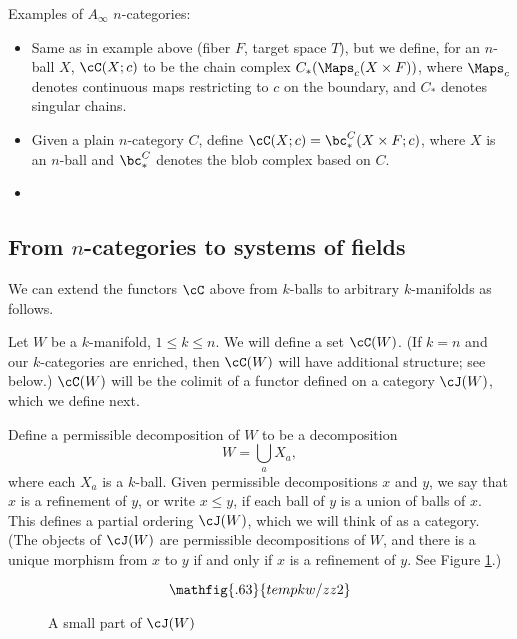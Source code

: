 Examples of $A_\infty$ $n$-categories:
\begin{itemize}

\item Same as in example  above (fiber $F$, target space $T$),
but we define, for an $n$-ball $X$, $\cC(X; c)$ to be the chain complex 
$C_*(\Maps_c(X\times F))$, where $\Maps_c$ denotes continuous maps restricting to $c$ on the boundary,
and $C_*$ denotes singular chains.

\item
Given a plain $n$-category $C$, 
define $\cC(X; c) = \bc^C_*(X\times F; c)$, where $X$ is an $n$-ball
and $\bc^C_*$ denotes the blob complex based on $C$.

\item {}

\end{itemize}






\subsection{From $n$-categories to systems of fields}
\label{ss:ncat_fields}

We can extend the functors $\cC$ above from $k$-balls to arbitrary $k$-manifolds as follows.

Let $W$ be a $k$-manifold, $1\le k \le n$.
We will define a set $\cC(W)$.
(If $k = n$ and our $k$-categories are enriched, then
$\cC(W)$ will have additional structure; see below.)
$\cC(W)$ will be the colimit of a functor defined on a category $\cJ(W)$,
which we define next.

Define a permissible decomposition of $W$ to be a decomposition
\[
	W = \bigcup_a X_a ,
\]
where each $X_a$ is a $k$-ball.
Given permissible decompositions $x$ and $y$, we say that $x$ is a refinement
of $y$, or write $x \le y$, if each ball of $y$ is a union of balls of $x$.
This defines a partial ordering $\cJ(W)$, which we will think of as a category.
(The objects of $\cJ(W)$ are permissible decompositions of $W$, and there is a unique
morphism from $x$ to $y$ if and only if $x$ is a refinement of $y$.
See Figure \ref{partofJfig}.)

\begin{figure}[!ht]
\begin{equation*}
\mathfig{.63}{tempkw/zz2}
\end{equation*}
\caption{A small part of $\cJ(W)$}
\label{partofJfig}
\end{figure}


